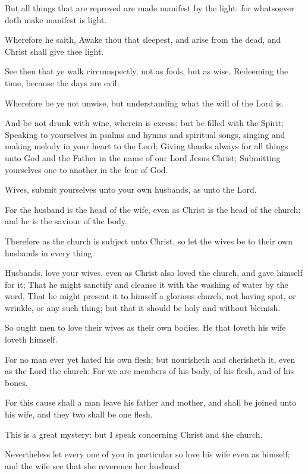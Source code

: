 \Verse But all things that are reproved are made manifest by the light: for whatsoever doth make manifest is light.

\Verse Wherefore he saith, Awake thou that sleepest, and arise from the dead, and Christ shall give thee light.

\Verse See then that ye walk circumspectly, not as fools, but as wise, \Verse Redeeming the time, because the days are evil.

\Verse Wherefore be ye not unwise, but understanding what the will of the Lord is.

\Verse And be not drunk with wine, wherein is excess; but be filled with the Spirit; \Verse Speaking to yourselves in psalms and hymns and spiritual songs, singing and making melody in your heart to the Lord; \Verse Giving thanks always for all things unto God and the Father in the name of our Lord Jesus Christ; \Verse Submitting yourselves one to another in the fear of God.

\Verse Wives, submit yourselves unto your own husbands, as unto the Lord.

\Verse For the husband is the head of the wife, even as Christ is the head of the church: and he is the saviour of the body.

\Verse Therefore as the church is subject unto Christ, so let the wives be to their own husbands in every thing.

\Verse Husbands, love your wives, even as Christ also loved the church, and gave himself for it; \Verse That he might sanctify and cleanse it with the washing of water by the word, \Verse That he might present it to himself a glorious church, not having spot, or wrinkle, or any such thing; but that it should be holy and without blemish.

\Verse So ought men to love their wives as their own bodies. He that loveth his wife loveth himself.

\Verse For no man ever yet hated his own flesh; but nourisheth and cherisheth it, even as the Lord the church: \Verse For we are members of his body, of his flesh, and of his bones.

\Verse For this cause shall a man leave his father and mother, and shall be joined unto his wife, and they two shall be one flesh.

\Verse This is a great mystery: but I speak concerning Christ and the church.

\Verse Nevertheless let every one of you in particular so love his wife even as himself; and the wife see that she reverence her husband.


